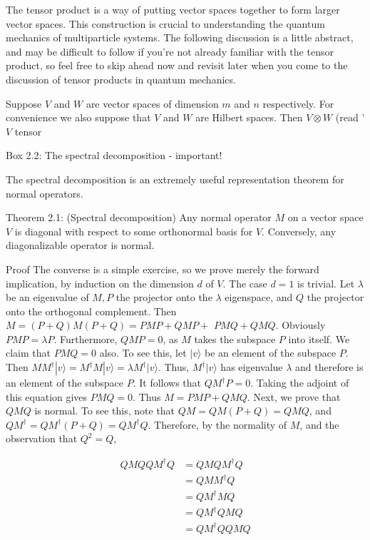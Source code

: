The tensor product is a way of putting vector spaces together to form larger vector spaces. This construction is crucial to understanding the quantum mechanics of multiparticle systems. The following discussion is a little abstract, and may be difficult to follow if you're not already familiar with the tensor product, so feel free to skip ahead now and revisit later when you come to the discussion of tensor products in quantum mechanics.

Suppose $V$ and $W$ are vector spaces of dimension $m$ and $n$ respectively. For convenience we also suppose that $V$ and $W$ are Hilbert spaces. Then $V \otimes W$ (read ' $V$ tensor

Box 2.2: The spectral decomposition - important!

The spectral decomposition is an extremely useful representation theorem for normal operators.

Theorem 2.1: (Spectral decomposition) Any normal operator $M$ on a vector space $V$ is diagonal with respect to some orthonormal basis for $V$. Conversely, any diagonalizable operator is normal.

Proof
The converse is a simple exercise, so we prove merely the forward implication, by induction on the dimension $d$ of $V$. The case $d=1$ is trivial. Let $\lambda$ be an eigenvalue of $M, P$ the projector onto the $\lambda$ eigenspace, and $Q$ the projector onto the orthogonal complement. Then $M=(P+Q) M(P+Q)=P M P+Q M P+$ $P M Q+Q M Q$. Obviously $P M P=\lambda P$. Furthermore, $Q M P=0$, as $M$ takes the subspace $P$ into itself. We claim that $P M Q=0$ also. To see this, let $|v\rangle$ be an element of the subspace $P$. Then $M M^{\dagger}|v\rangle=M^{\dagger} M|v\rangle=\lambda M^{\dagger}|v\rangle$. Thus, $M^{\dagger}|v\rangle$ has eigenvalue $\lambda$ and therefore is an element of the subspace $P$. It follows that $Q M^{\dagger} P=0$. Taking the adjoint of this equation gives $P M Q=0$. Thus $M=P M P+Q M Q$. Next, we prove that $Q M Q$ is normal. To see this, note that $Q M=Q M(P+Q)=Q M Q$, and $Q M^{\dagger}=Q M^{\dagger}(P+Q)=Q M^{\dagger} Q$. Therefore, by the normality of $M$, and the observation that $Q^{2}=Q$,

$$
\begin{aligned}
Q M Q Q M^{\dagger} Q & =Q M Q M^{\dagger} Q \\
& =Q M M^{\dagger} Q \\
& =Q M^{\dagger} M Q \\
& =Q M^{\dagger} Q M Q \\
& =Q M^{\dagger} Q Q M Q
\end{aligned}
$$

